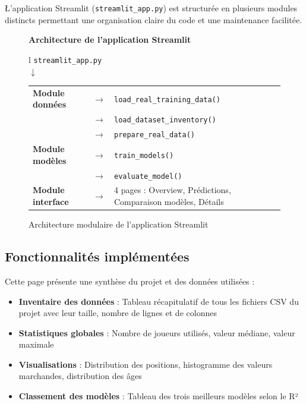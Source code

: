 \documentclass[12pt,a4paper]{article}
\begin{document}
\L'application Streamlit (\texttt{streamlit\_app.py}) est structurée en plusieurs modules distincts permettant une organisation claire du code et une maintenance facilitée.

\begin{figure}[H]
\centering
\begin{tcolorbox}[colback=lightgray,colframe=maincolor,width=0.9\textwidth,arc=2mm,boxrule=0.8pt]
\centering
\textbf{Architecture de l'application Streamlit}\\[0.3cm]
\begin{tabular}{l}
\texttt{streamlit\_app.py} \\
$\downarrow$ \\
\begin{tabular}{lcl}
\textbf{Module données} & $\rightarrow$ & \texttt{load\_real\_training\_data()} \\
 & $\rightarrow$ & \texttt{load\_dataset\_inventory()} \\
 & $\rightarrow$ & \texttt{prepare\_real\_data()} \\[0.2cm]
\textbf{Module modèles} & $\rightarrow$ & \texttt{train\_models()} \\
 & $\rightarrow$ & \texttt{evaluate\_model()} \\[0.2cm]
\textbf{Module interface} & $\rightarrow$ & 4 pages : Overview, Prédictions, Comparaison modèles, Détails \\
\end{tabular}
\end{tabular}
\end{tcolorbox}
\caption{Architecture modulaire de l'application Streamlit}
\end{figure}

\subsection{Fonctionnalités implémentées}


Cette page présente une synthèse du projet et des données utilisées :

\begin{itemize}[leftmargin=*]
    \item \textbf{Inventaire des données} : Tableau récapitulatif de tous les fichiers CSV du projet avec leur taille, nombre de lignes et de colonnes
    \item \textbf{Statistiques globales} : Nombre de joueurs utilisés, valeur médiane, valeur maximale
    \item \textbf{Visualisations} : Distribution des positions, histogramme des valeurs marchandes, distribution des âges
    \item \textbf{Classement des modèles} : Tableau des trois meilleurs modèles selon le R²
\end{itemize}
\end{document}
